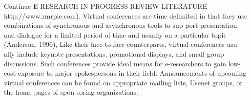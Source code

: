 \documentclass{beamer}
\begin{document}
\begin{frame}{Continue E-RESEARCH IN PROGRESS REVIEW LITERATURE}
http://www.rmrple.com). Virtual conferences are time delimited in that
they use combinations of synchronous and asynchronous tools to sup port
presentation and dialogue for a limited period of time and usually on a
particular topic (Anderson, 1996), Like their face-to-face counterparts, virtual
conferences usu ally include keynote presentations, promotional displays,
and small group discussions. Such conferences provide ideal means
for e-researchers to gain low-cost exposure to major spokespersons in their
field. Announcements of upcoming virtual conferences can be found on
appropriate mailing lists, Usenet groups, or the home pages of spon soring
organizations.

\end{frame}
\end{document}
